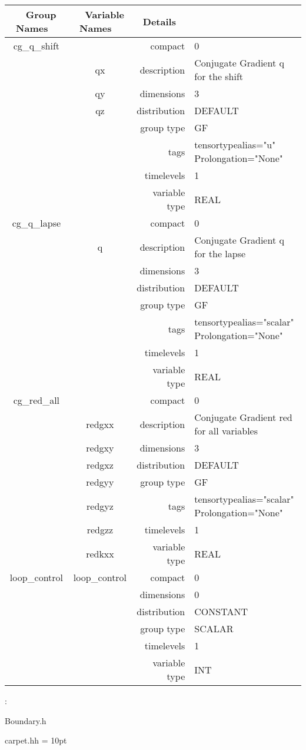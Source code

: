 \begin{tabular*}{150mm}{|c|c@{\extracolsep{\fill}}|rl|} \hline 
~ {\bf Group Names} ~ & ~ {\bf Variable Names} ~  &{\bf Details} ~ & ~ \\ 
\hline 
cg\_q\_shift &  & compact & 0 \\ 
 & qx & description & Conjugate Gradient q for the shift \\ 
 & qy & dimensions & 3 \\ 
 & qz & distribution & DEFAULT \\ 
 &  & group type & GF \\ 
 &  & tags & tensortypealias="u" Prolongation="None" \\ 
 &  & timelevels & 1 \\ 
 &  & variable type & REAL \\ 
\hline 
cg\_q\_lapse &  & compact & 0 \\ 
 & q & description & Conjugate Gradient q for the lapse \\ 
 &  & dimensions & 3 \\ 
 &  & distribution & DEFAULT \\ 
 &  & group type & GF \\ 
 &  & tags & tensortypealias="scalar" Prolongation="None" \\ 
 &  & timelevels & 1 \\ 
 &  & variable type & REAL \\ 
\hline 
cg\_red\_all &  & compact & 0 \\ 
 & redgxx & description & Conjugate Gradient red for all variables \\ 
 & redgxy & dimensions & 3 \\ 
 & redgxz & distribution & DEFAULT \\ 
 & redgyy & group type & GF \\ 
 & redgyz & tags & tensortypealias="scalar" Prolongation="None" \\ 
 & redgzz & timelevels & 1 \\ 
 & redkxx & variable type & REAL \\ 
\hline 
loop\_control & loop\_control & compact & 0 \\ 
 &  & dimensions & 0 \\ 
 &  & distribution & CONSTANT \\ 
 &  & group type & SCALAR \\ 
 &  & timelevels & 1 \\ 
 &  & variable type & INT \\ 
\hline 
\end{tabular*} 



\vspace{5mm}

: 

Boundary.h

carpet.hh
\vspace{2mm}\parskip = 10pt 
